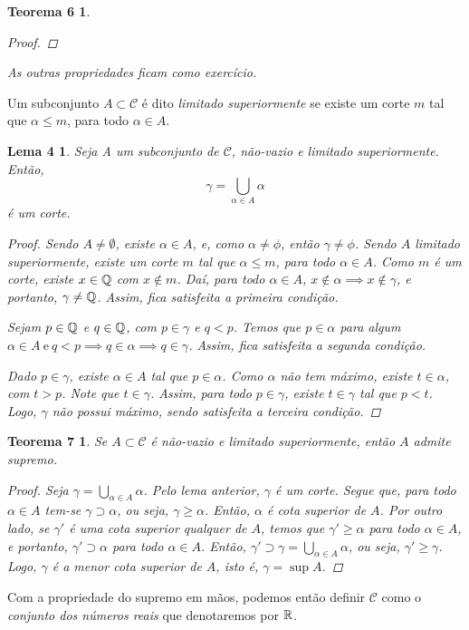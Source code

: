 \documentclass[a4paper,12pt]{article}
\newtheorem*{t6}{Teorema 6}
\newtheorem*{t7}{Teorema 7}
\newtheorem*{l4}{Lema 4}
\begin{document}
\begin{t6}
\begin{proof}
	\end{proof}
		
		As outras propriedades ficam como exercício.
		
	\end{t6}


Um subconjunto $A \subset \mathcal C$ é dito \textit{limitado superiormente} se existe um corte $m$ tal que $\alpha \leq m$, para todo $\alpha \in A$.

	\begin{l4}
		
		Seja A um subconjunto de $\mathcal C$, não-vazio e limitado superiormente. Então, $$\gamma = \bigcup_{\alpha \in A} \alpha$$ é um corte.
		
		\begin{proof}
			
			Sendo $A \neq \emptyset$, existe $\alpha \in A$, e, como $\alpha \neq \phi$, então $\gamma \neq \phi$. Sendo $A$ limitado superiormente, existe um corte $m$ tal que $\alpha \leq m$, para todo $\alpha \in A$. Como $m$ é um corte, existe $x \in \Bbb Q$ com $x \notin m$. Daí, para todo $\alpha \in A$, $x \notin \alpha \implies x \notin \gamma$, e portanto, $\gamma \neq \Bbb Q$. Assim, fica satisfeita a primeira condição.
			
			Sejam $p \in \Bbb Q$ e $q \in \Bbb Q$, com $p \in \gamma$ e $q < p$. Temos que $p \in \alpha$ para algum $\alpha \in A \ \text{e} \ q < p \implies q \in \alpha \implies q \in \gamma$. Assim, fica satisfeita a segunda condição.
			
			Dado $p \in \gamma$, existe $\alpha \in A$ tal que $p \in \alpha$. Como $\alpha$ não tem máximo, existe $t \in \alpha$, com $t > p$. Note que $t \in \gamma$. Assim, para todo $p \in \gamma$, existe $t \in \gamma$ tal que $p < t$. Logo, $\gamma$ não possui máximo, sendo satisfeita a terceira condição.
			
		\end{proof}
		
	\end{l4}

	\begin{t7}
		
		Se $A \subset \mathcal C$ é não-vazio e limitado superiormente, então $A$ admite supremo.
		
		\begin{proof}
			
			Seja $\gamma = \bigcup_{\alpha \in A}\alpha$. Pelo lema anterior, $\gamma$ é um corte. Segue que, para todo $\alpha \in A$ tem-se $\gamma \supset \alpha$, ou seja, $\gamma \geq \alpha$. Então, $\alpha$ é cota superior de $A$. Por outro lado, se $\gamma'$ é uma cota superior qualquer de $A$, temos que $\gamma' \geq \alpha$ para todo $\alpha \in A$, e portanto, $\gamma' \supset \alpha$ para todo $\alpha \in A$. Então, $\gamma' \supset \gamma = \bigcup_{\alpha \in A}\alpha$, ou seja, $\gamma' \geq \gamma$. Logo, $\gamma$ é a menor cota superior de $A$, isto é, $\gamma = \sup A$.
			
		\end{proof}
		
	\end{t7}

Com a propriedade do supremo em mãos, podemos então definir $\mathcal C$ como o \textit{conjunto dos números reais} que denotaremos por $\Bbb R$.
\end{document}
